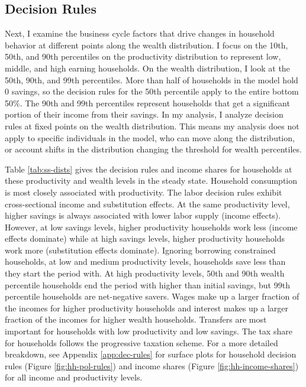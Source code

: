 \subsection{Decision Rules} \label{subsec:buis-dec-rules}

Next, I examine the business cycle factors that drive changes in household behavior at different points along the wealth distribution. I focus on the 10th, 50th, and 90th percentiles on the productivity distribution to represent low, middle, and high earning households. On the wealth distribution, I look at the 50th, 90th, and 99th percentiles. More than half of households in the model hold 0 savings, so the decision rules for the 50th percentile apply to the entire bottom 50\%. The 90th and 99th percentiles represent households that get a significant portion of their income from their savings. In my analysis, I analyze decision rules at fixed points on the wealth distribution. This means my analysis does not apply to specific individuals in the model, who can move along the distribution, or account shifts in the distribution changing the threshold for wealth percentiles.

Table \ref{tab:ss-dists} gives the decision rules and income shares for households at these productivity and wealth levels in the steady state. Household consumption is most closely associated with productivity. The labor decision rules exhibit cross-sectional income and substitution effects. At the same productivity level, higher savings is always associated with lower labor supply (income effects). However, at low savings levels, higher productivity households work less (income effects dominate) while at high savings levels, higher productivity households work more (substitution effects dominate). Ignoring borrowing constrained households, at low and medium productivity levels, households save less than they start the period with. At high productivity levels, 50th and 90th wealth percentile households end the period with higher than initial savings, but 99th percentile households are net-negative savers. Wages make up a larger fraction of the incomes for higher productivity households and interest makes up a larger fraction of the incomes for higher wealth households. Transfers are most important for households with low productivity and low savings. The tax share for households follows the progressive taxation scheme. For a more detailed breakdown, see Appendix \ref{app:dec-rules} for surface plots for household decision rules (Figure \ref{fig:hh-pol-rules}) and income shares (Figure \ref{fig:hh-income-shares}) for all income and productivity levels.

